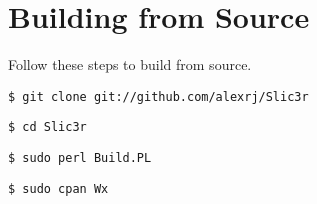 \section{Building from Source}
\label{buildingFromSource}

Follow these steps to build from source.

\texttt{\$ git clone git://github.com/alexrj/Slic3r}

\texttt{\$ cd Slic3r}

\texttt{\$ sudo perl Build.PL}

\texttt{\$ sudo cpan Wx}

